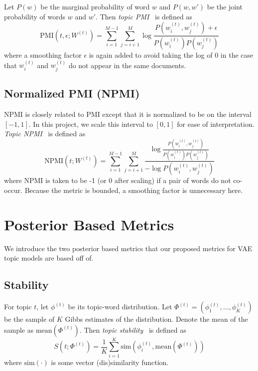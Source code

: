 \documentclass[10pt]{article}
\begin{document}
Let $P(w)$ be the marginal probability of word $w$ and $P(w,w')$ be the joint probability of words $w$ and $w'$. Then \textit{topic PMI}~\cite{Lau:2014} is defined as
\[
\textrm{PMI}\left(t,\epsilon;W^{(t)}\right) = \sum_{i=1}^{M-1}\sum_{j=i+1}^M\log\frac{P\left(w_i^{(t)},w_j^{(t)}\right)+\epsilon}{P\left(w_i^{(t)}\right)P\left(w_j^{(t)}\right)}
\]
where a smoothing factor $\epsilon$ is again added to avoid taking the log of 0 in the case that $w_i^{(t)}$ and $w_j^{(t)}$ do not appear in the same documents.

\subsection{Normalized PMI (NPMI)}

NPMI is closely related to PMI except that it is normalized to be on the interval $[-1,1]$. In this project, we scale this interval to $[0,1]$ for ease of interpretation. \textit{Topic NPMI}~\cite{Lau:2014} is defined as
\[
\textrm{NPMI}\left(t;W^{(t)}\right) = \sum_{i=1}^{M-1}\sum_{j=i+1}^M\frac{\log\frac{P\left(w_i^{(t)},w_j^{(t)}\right)}{P\left(w_i^{(t)}\right)P\left(w_j^{(t)}\right)}}{-\log P\left(w_i^{(t)},w_j^{(t)}\right)}
\]
where NPMI is taken to be -1 (or 0 after scaling) if a pair of words do not co-occur. Because the metric is bounded, a smoothing factor is unnecessary here.

\section{Posterior Based Metrics}\label{sec:posterior}

We introduce the two posterior based metrics that our proposed metrics for VAE topic models are based off of.

\subsection{Stability}

For topic $t$, let $\phi^{(t)}$ be its topic-word distribution. Let $\Phi^{(t)}=\left(\phi_1^{(t)},...,\phi_K^{(t)}\right)$ be the sample of $K$ Gibbs estimates of the distribution. Denote the mean of the sample as $\textrm{mean}\left(\Phi^{(t)}\right)$. Then \textit{topic stability}~\cite{Xing:2018} is defined as
\[
S\left(t;\Phi^{(t)}\right) = \frac{1}{K}\sum_{i=1}^K\textrm{sim}\left(\phi_i^{(t)},\textrm{mean}\left(\Phi^{(t)}\right)\right)
\]
where $\textrm{sim}(\cdot)$ is some vector (dis)similarity function.
\end{document}
